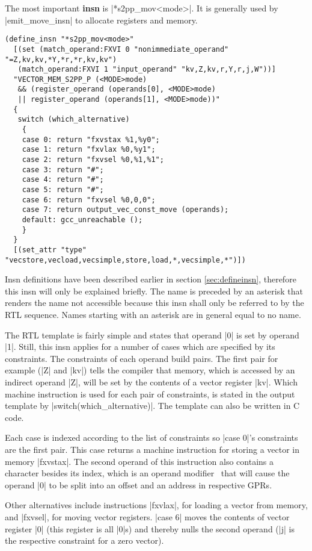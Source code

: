 The most important \textbf{insn} is |*s2pp_mov<mode>|.
It is generally used by |emit_move_insn| to allocate registers and memory.
\begin{lstlisting}
(define_insn "*s2pp_mov<mode>"
  [(set (match_operand:FXVI 0 "nonimmediate_operand" "=Z,kv,kv,*Y,*r,*r,kv,kv")
   (match_operand:FXVI 1 "input_operand" "kv,Z,kv,r,Y,r,j,W"))]
  "VECTOR_MEM_S2PP_P (<MODE>mode)
   && (register_operand (operands[0], <MODE>mode) 
   || register_operand (operands[1], <MODE>mode))"
  { 
   switch (which_alternative)
    {
    case 0: return "fxvstax %1,%y0";
    case 1: return "fxvlax %0,%y1";
    case 2: return "fxvsel %0,%1,%1";
    case 3: return "#";
    case 4: return "#";
    case 5: return "#";
    case 6: return "fxvsel %0,0,0";
    case 7: return output_vec_const_move (operands);
    default: gcc_unreachable ();
    }
  } 
  [(set_attr "type" "vecstore,vecload,vecsimple,store,load,*,vecsimple,*")])
\end{lstlisting}

Insn definitions have been described earlier in section \ref{sec:defineinsn}, therefore this insn will only be explained briefly.
The name is preceded by an asterisk that renders the name not accessible because this insn shall only be referred to by the \ac{RTL} sequence.
Names starting with an asterisk are in general equal to no name.

The \ac{RTL} template is fairly simple and states that operand |0| is set by operand |1|.
Still, this insn applies for a number of cases which are specified by its constraints.
The constraints of each operand build pairs.
The first pair for example (|Z| and |kv|) tells the compiler that memory, which is accessed by an indirect operand |Z|, will be set by the contents of a vector register |kv|.
Which machine instruction is used for each pair of constraints, is stated in the output template by |switch(which_alternative)|.
The template can also be written in C code.

Each case is indexed according to the list of constraints so |case 0|'s constraints are the first pair.
This case returns a machine instruction for storing a vector in memory |fxvstax|.
The second operand of this instruction also contains a character besides its index, which is an operand modifier~\citep[ch.~6.45.2]{GCCint} that will cause the operand |0| to be split into an offset and an address in respective \acp{GPR}.

Other alternatives include instructions |fxvlax|, for loading a vector from memory, and |fxvsel|, for moving vector registers.
|case 6| moves the contents of vector register |0| (this register is all |0|s) and thereby nulls the second operand (|j| is the respective constraint for a zero vector).

